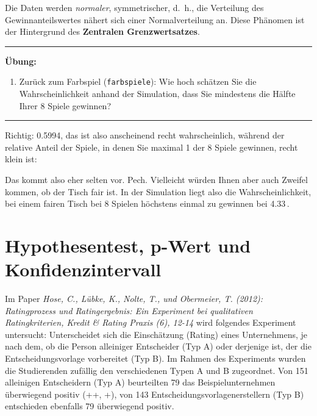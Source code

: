 \documentclass[12pt,ngerman,paper=a4,pagesize,DIV=13]{scrreprt}
\newenvironment{Shaded}{\begin{snugshade}}{\end{snugshade}}
\newcommand{\DecValTok}[1]{\textcolor[rgb]{0.00,0.00,0.81}{#1}}
\newcommand{\KeywordTok}[1]{\textcolor[rgb]{0.13,0.29,0.53}{\textbf{#1}}}
\newcommand{\NormalTok}[1]{#1}
\newcommand{\OperatorTok}[1]{\textcolor[rgb]{0.81,0.36,0.00}{\textbf{#1}}}
\newcommand{\StringTok}[1]{\textcolor[rgb]{0.31,0.60,0.02}{#1}}
\providecommand{\tightlist}{%
  \setlength{\itemsep}{0pt}\setlength{\parskip}{0pt}}
\begin{document}
Die Daten werden \emph{normaler}, symmetrischer, d.~h., die Verteilung
des Gewinnanteilswertes nähert sich einer Normalverteilung an. Diese
Phänomen ist der Hintergrund des \textbf{Zentralen Grenzwertsatzes}.

\begin{center}\rule{0.5\linewidth}{\linethickness}\end{center}

\textbf{Übung:}

\begin{enumerate}
\def\labelenumi{\arabic{enumi}.}
\setcounter{enumi}{1}
\tightlist
\item
  Zurück zum Farbspiel (\texttt{farbspiele}): Wie hoch schätzen Sie die
  Wahrscheinlichkeit anhand der Simulation, dass Sie mindestens die
  Hälfte Ihrer 8 Spiele gewinnen?
\end{enumerate}

\begin{center}\rule{0.5\linewidth}{\linethickness}\end{center}

Richtig: 0.5994, das ist also anscheinend recht wahrscheinlich, während
der relative Anteil der Spiele, in denen Sie maximal 1 der 8 Spiele
gewinnen, recht klein ist:

\begin{Shaded}
\end{Shaded}

Das kommt also eher selten vor. Pech. Vielleicht würden Ihnen aber auch
Zweifel kommen, ob der Tisch fair ist. In der Simulation liegt also die
Wahrscheinlichkeit, bei einem fairen Tisch bei 8 Spielen höchstens
einmal zu gewinnen bei 4.33\(\,\).

\hypertarget{hypothesentest-p-wert-und-konfidenzintervall}{%
\section{Hypothesentest, p-Wert und
Konfidenzintervall}\label{hypothesentest-p-wert-und-konfidenzintervall}}

Im Paper \emph{Hose, C., Lübke, K., Nolte, T., und Obermeier, T. (2012):
Ratingprozess und Ratingergebnis: Ein Experiment bei qualitativen
Ratingkriterien, Kredit \& Rating Praxis (6), 12-14} wird folgendes
Experiment untersucht: Unterscheidet sich die Einschätzung (Rating)
eines Unternehmens, je nach dem, ob die Person alleiniger Entscheider
(Typ A) oder derjenige ist, der die Entscheidungsvorlage vorbereitet
(Typ B). Im Rahmen des Experiments wurden die Studierenden zufällig den
verschiedenen Typen A und B zugeordnet. Von 151 alleinigen Entscheidern
(Typ A) beurteilten 79 das Beispielunternehmen überwiegend positiv (++,
+), von 143 Entscheidungsvorlagenerstellern (Typ B) entschieden
ebenfalls 79 überwiegend positiv.
\end{document}
